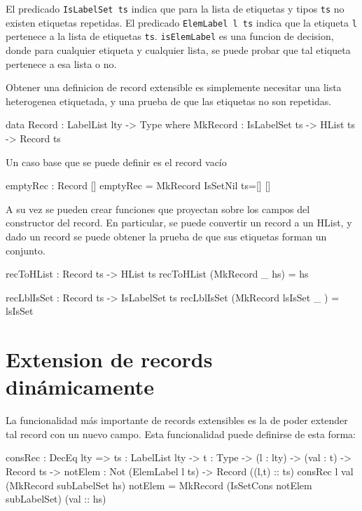 El predicado \texttt{IsLabelSet ts} indica que para la lista de etiquetas y tipos \texttt{ts} no existen etiquetas repetidas.
El predicado \texttt{ElemLabel l ts} indica que la etiqueta \texttt{l} pertenece a la lista de etiquetas \texttt{ts}.
\texttt{isElemLabel} es una funcion de decision, donde para cualquier etiqueta y cualquier lista, se puede probar que tal etiqueta pertenece a esa lista o no.

Obtener una definicion de record extensible es simplemente necesitar una lista heterogenea etiquetada, y una prueba de que las etiquetas no son repetidas.

\begin{code}
data Record : LabelList lty -> Type where
    MkRecord : IsLabelSet ts -> HList ts -> Record ts
\end{code}

Un caso base que se puede definir es el record vacío

\begin{code}
emptyRec : Record []
emptyRec = MkRecord IsSetNil {ts=[]} [] 
\end{code}

A su vez se pueden crear funciones que proyectan sobre los campos del constructor del record. En particular, se puede convertir un record a un HList, y dado un record se puede obtener la prueba de que sus etiquetas forman un conjunto.

\begin{code}
recToHList : Record ts -> HList ts
recToHList (MkRecord _ hs) = hs

recLblIsSet : Record ts -> IsLabelSet ts
recLblIsSet (MkRecord lsIsSet _ ) = lsIsSet  
\end{code}

\section{Extension de records dinámicamente}

La funcionalidad más importante de records extensibles es la de poder extender tal record con un nuevo campo. Esta funcionalidad puede definirse de esta forma:

\begin{code}
consRec : DecEq lty => {ts : LabelList lty} -> 
  {t : Type} -> (l : lty) -> (val : t) ->
  Record ts -> {notElem : Not (ElemLabel l ts)} -> 
  Record ((l,t) :: ts)
consRec l val (MkRecord subLabelSet hs) {notElem} = 
    MkRecord (IsSetCons notElem subLabelSet) (val :: hs)
\end{code}

